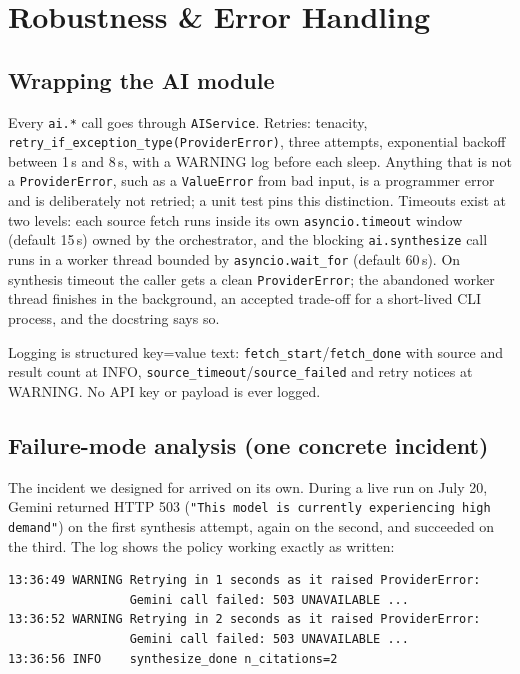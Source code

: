 \documentclass[11pt,a4paper]{article}
\begin{document}
\section{Robustness \& Error Handling}\label{sec:robustness}

\subsection{Wrapping the AI module}

Every \texttt{ai.*} call goes through \texttt{AIService}. Retries: tenacity, \texttt{retry\_if\_exception\_type(ProviderError)}, three attempts, exponential backoff between 1\,s and 8\,s, with a WARNING log before each sleep. Anything that is not a \texttt{ProviderError}, such as a \texttt{ValueError} from bad input, is a programmer error and is deliberately not retried; a unit test pins this distinction. Timeouts exist at two levels: each source fetch runs inside its own \texttt{asyncio.timeout} window (default 15\,s) owned by the orchestrator, and the blocking \texttt{ai.synthesize} call runs in a worker thread bounded by \texttt{asyncio.wait\_for} (default 60\,s). On synthesis timeout the caller gets a clean \texttt{ProviderError}; the abandoned worker thread finishes in the background, an accepted trade-off for a short-lived CLI process, and the docstring says so.

Logging is structured key=value text: \texttt{fetch\_start}/\texttt{fetch\_done} with source and result count at INFO, \texttt{source\_timeout}/\texttt{source\_failed} and retry notices at WARNING. No API key or payload is ever logged.

\subsection{Failure-mode analysis (one concrete incident)}

The incident we designed for arrived on its own. During a live run on July 20, Gemini returned HTTP 503 (\texttt{"This model is currently experiencing high demand"}) on the first synthesis attempt, again on the second, and succeeded on the third. The log shows the policy working exactly as written:

\begin{lstlisting}[style=python,language=bash,numbers=none,basicstyle=\ttfamily\footnotesize]
13:36:49 WARNING Retrying in 1 seconds as it raised ProviderError:
                 Gemini call failed: 503 UNAVAILABLE ...
13:36:52 WARNING Retrying in 2 seconds as it raised ProviderError:
                 Gemini call failed: 503 UNAVAILABLE ...
13:36:56 INFO    synthesize_done n_citations=2
\end{lstlisting}
\end{document}
